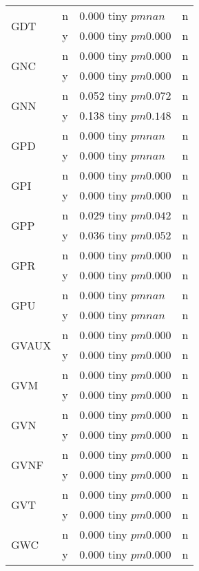 \begin{table}
\begin{tabular}{llll}
\cline{1-4}
\multirow[t]{2}{*}{GDT} & n & 0.000 tiny $ pm nan$ & n \\
 & y & 0.000 tiny $ pm 0.000$ & n \\
\cline{1-4}
\multirow[t]{2}{*}{GNC} & n & 0.000 tiny $ pm 0.000$ & n \\
 & y & 0.000 tiny $ pm 0.000$ & n \\
\cline{1-4}
\multirow[t]{2}{*}{GNN} & n & 0.052 tiny $ pm 0.072$ & n \\
 & y & 0.138 tiny $ pm 0.148$ & n \\
\cline{1-4}
\multirow[t]{2}{*}{GPD} & n & 0.000 tiny $ pm nan$ & n \\
 & y & 0.000 tiny $ pm nan$ & n \\
\cline{1-4}
\multirow[t]{2}{*}{GPI} & n & 0.000 tiny $ pm 0.000$ & n \\
 & y & 0.000 tiny $ pm 0.000$ & n \\
\cline{1-4}
\multirow[t]{2}{*}{GPP} & n & 0.029 tiny $ pm 0.042$ & n \\
 & y & 0.036 tiny $ pm 0.052$ & n \\
\cline{1-4}
\multirow[t]{2}{*}{GPR} & n & 0.000 tiny $ pm 0.000$ & n \\
 & y & 0.000 tiny $ pm 0.000$ & n \\
\cline{1-4}
\multirow[t]{2}{*}{GPU} & n & 0.000 tiny $ pm nan$ & n \\
 & y & 0.000 tiny $ pm nan$ & n \\
\cline{1-4}
\multirow[t]{2}{*}{GVAUX} & n & 0.000 tiny $ pm 0.000$ & n \\
 & y & 0.000 tiny $ pm 0.000$ & n \\
\cline{1-4}
\multirow[t]{2}{*}{GVM} & n & 0.000 tiny $ pm 0.000$ & n \\
 & y & 0.000 tiny $ pm 0.000$ & n \\
\cline{1-4}
\multirow[t]{2}{*}{GVN} & n & 0.000 tiny $ pm 0.000$ & n \\
 & y & 0.000 tiny $ pm 0.000$ & n \\
\cline{1-4}
\multirow[t]{2}{*}{GVNF} & n & 0.000 tiny $ pm 0.000$ & n \\
 & y & 0.000 tiny $ pm 0.000$ & n \\
\cline{1-4}
\multirow[t]{2}{*}{GVT} & n & 0.000 tiny $ pm 0.000$ & n \\
 & y & 0.000 tiny $ pm 0.000$ & n \\
\cline{1-4}
\multirow[t]{2}{*}{GWC} & n & 0.000 tiny $ pm 0.000$ & n \\
 & y & 0.000 tiny $ pm 0.000$ & n \\

\end{tabular}
\end{table}
